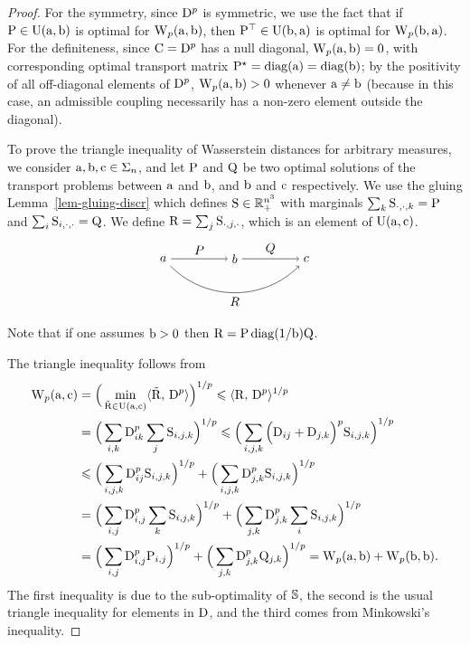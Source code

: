 \begin{proof}
For the symmetry, since $\distD^p$ is symmetric, we use the fact that if $\P \in \CouplingsD(\a,\b)$ is optimal for $\WassD_p(\a,\b)$, then $\P^\top \in \CouplingsD(\b,\a)$ is optimal for $\WassD_p(\b,\a)$. For the definiteness, since $\C = \distD^p$ has a null diagonal, $\WassD_p(\a,\b)=0$, with corresponding optimal transport matrix $\P^\star=\diag(\a)=\diag(\b)$; by the positivity of all off-diagonal elements of $\distD^p$, $\WassD_p(\a,\b)>0$ whenever $\a\ne \b$ (because in this case, an admissible coupling necessarily has a non-zero element outside the diagonal). 

To prove the triangle inequality of Wasserstein distances for arbitrary measures, we consider $\a,\b,\VectMode{c} \in\simplex_n$, and let $\P$ and $\Q$ be two optimal solutions of the transport problems between $\a$ and $\b$, and $\b$ and $\VectMode{c}$ respectively. 
%
We use the gluing Lemma~\ref{lem-gluing-discr} which defines $\S \in \RR_+^{n^3}$ with marginals $\sum_{k}\S_{\cdot,\cdot,k}=\P$ and $\sum_i \S_{i,\cdot,\cdot}=\Q$. We define $\R=\sum_{j}\S_{\cdot,j,\cdot}$, which is an element of $\CouplingsD(\a,\VectMode{c})$. 
\[
\begin{tikzpicture}
  \node (a) at (0,0) {$a$};
  \node (b) at (2,0) {$b$};
  \node (c) at (4,0) {$c$};
  
  \draw[->] (a) -- (b) node[midway, above] {$P$};
  \draw[->] (b) -- (c) node[midway, above] {$Q$};
  \draw[->, bend right=45] (a) to node[midway, below] {$R$} (c);
\end{tikzpicture}
\]
Note that if one assumes $\b>0$ then $\R = \P \diag(1/\b) \Q$.
%

The triangle inequality follows from
$$\begin{aligned}
\WassD_p(\a,\VectMode{c})&=\Big(\min_{\tilde\R\in \CouplingsD(\a,\VectMode{c})}\dotp{\tilde\R}{\distD^p}\Big)^{1/p} \leq \dotp{\R}{\distD^p}^{1/p}\\
&= \Big(\sum_{i,k}  \distD^p_{ik}\sum_{j} \S_{i,j,k} \Big)^{1/p} 
 \leq \Big(\sum_{i,j,k} \left(\distD_{ij}+\distD_{j,k}\Big)^p  \S_{i,j,k} \right)^{1/p} \\
& \leq \Big(\sum_{i,j,k} \distD^p_{ij} \S_{i,j,k} \Big)^{1/p} + \Big(\sum_{i,j,k}\distD^p_{j,k} \S_{i,j,k} \Big)^{1/p} \\
&= \Big(\sum_{i,j} \distD^p_{i,j}  \sum_k \S_{i,j,k} \Big)^{1/p} + \Big(\sum_{j,k} \distD^p_{j,k}  \sum_i \S_{i,j,k} \Big)^{1/p}\\
&= \Big(\sum_{i,j} \distD^p_{i,j}\P_{i,j}\Big)^{1/p} + \Big(\sum_{j,k} \distD^p_{j,k} \Q_{j,k}\Big)^{1/p} 
= \WassD_p(\a,\b) +\WassD_p(\b,\b).
\end{aligned}
$$
%
The first inequality is due to the sub-optimality of $\SS$, the second is the usual triangle inequality for elements in $\distD$, and the third comes from Minkowski's inequality.
\end{proof}

